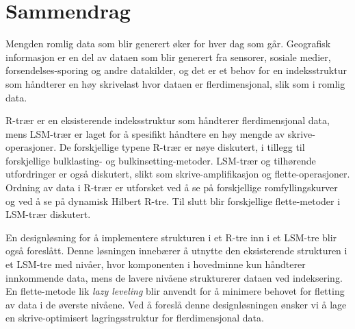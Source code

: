 \chapter*{Sammendrag}

Mengden romlig data som blir generert øker for hver dag som går. Geografisk informasjon er en del av dataen som blir generert fra sensorer, sosiale medier, forsendelses-sporing og andre datakilder, og det er et behov for en indeksstruktur som håndterer en høy skrivelast hvor dataen er flerdimensjonal, slik som i romlig data.\newline

\noindent
R-trær er en eksisterende indeksstruktur som håndterer flerdimensjonal data, mens LSM-trær er laget for å spesifikt håndtere en høy mengde av skrive-operasjoner. De forskjellige typene R-trær er nøye diskutert, i tillegg til forskjellige bulklasting- og bulkinsetting-metoder. LSM-trær og tilhørende utfordringer er også diskutert, slikt som skrive-amplifikasjon og flette-operasjoner. Ordning av data i R-trær er utforsket ved å se på forskjellige romfyllingskurver og ved å se på dynamisk Hilbert R-tre. Til slutt blir forskjellige flette-metoder i LSM-trær diskutert.\newline

\noindent
En designløsning for å implementere strukturen i et R-tre inn i et LSM-tre blir også foreslått. Denne løsningen innebærer å utnytte den eksisterende strukturen i et LSM-tre med nivåer, hvor komponenten i hovedminne kun håndterer innkommende data, mens de lavere nivåene strukturerer dataen ved indeksering. En flette-metode lik \emph{lazy leveling} blir anvendt for å minimere behovet for fletting av data i de øverste nivåene. Ved å foreslå denne designløsningen ønsker vi å lage en skrive-optimisert lagringsstruktur for flerdimensjonal data. 
